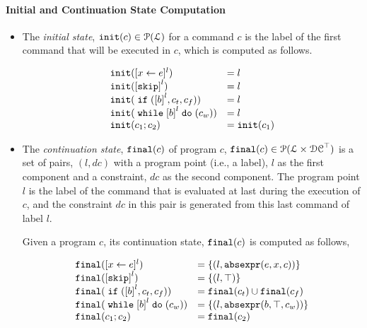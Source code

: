 \paragraph{Initial and Continuation State Computation}
%
\begin{itemize}
 \item The \emph{initial state}, $\mathtt{init}(c) \in \mathcal{P}(\mathcal{L})$
 for a command $c$ is the label of the first command that will be executed in $c$,
 which is computed as follows.

\[
 \begin{array}{ll}
 \absinit(\clabel{\assign{x}{\expr}}{}^l) & = l \\
 \absinit(\clabel{\eskip}^{l}) & = l \\
 \absinit(\eif (\clabel{\bexpr}^l, c_t, c_f)) & = l \\
 \absinit(\ewhile \clabel{\bexpr}^l \edo (c_w)) & = l \\
 \absinit(c_1 ; c_2) & = \absinit(c_1) \\
 \end{array}
 \]
%
%
\item The \emph{continuation state}, $\mathtt{final}(c)$ of program $c$, 
$\mathtt{final}(c) \in \mathcal{P}(\mathcal{L} \times \mathcal{DC}^{\top})$
is a set of pairs, $(l, dc)$ with a
program point (i.e., a label), $l$ as the first component and a constraint, 
$dc$ as the second component.
The program point $l$ is the label of the command that is evaluated at last during the execution of $c$,
and the constraint $dc$ in this pair is generated from this last command of label $l$.

Given a program $c$, its continuation state, $\mathtt{final}(c)$ is computed as follows,

\[
 \begin{array}{ll}
 \absfinal(\clabel{\assign{x}{\expr}}{}^l) & = \{(l, \absexpr(\expr, x, c))\} \\
 \absfinal(\clabel{\eskip}^{l}) 
 & = \{(l, \top)\} \\
 \absfinal(\eif (\clabel{\bexpr}^l, c_t, c_f)) & = \absfinal(c_t) \cup \absfinal(c_f) \\
 \absfinal(\ewhile \clabel{\bexpr}^l \edo (c_w)) & = \{(l, \absexpr(\bexpr, \top, c_w))\} \\
 \absfinal(c_1 ; c_2) & = \absfinal(c_2) \\
 \end{array}
 \]
\end{itemize}
